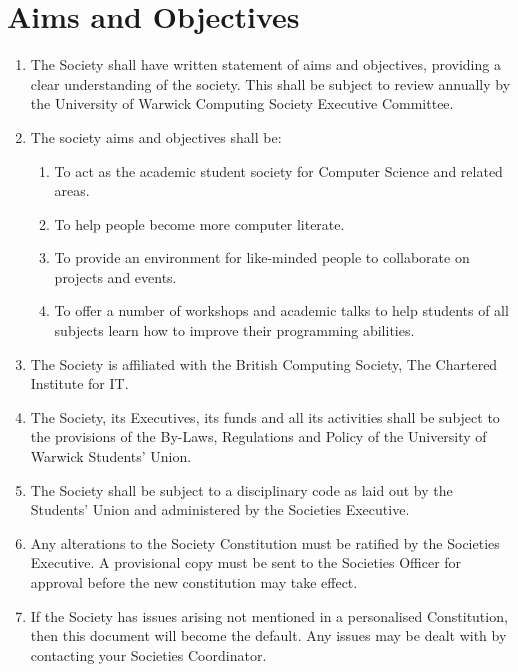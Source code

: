 \documentclass{article}
\begin{document}
\section{Aims and Objectives}
\begin{enumerate}
    \item The Society shall have written statement of aims and objectives, providing a clear understanding of the society. This shall be subject to review annually by the University of Warwick Computing Society Executive Committee.
    \item The society aims and objectives shall be:
    \begin{enumerate}
        \item To act as the academic student society for Computer Science and related areas.
        \item To help people become more computer literate.
        \item To provide an environment for like-minded people to collaborate on projects and events.
        \item To offer a number of workshops and academic talks to help students of all subjects learn how to improve their programming abilities.
    \end{enumerate}
    \item The Society is affiliated with the British Computing Society, The Chartered Institute for IT.
    \item The Society, its Executives, its funds and all its activities shall be subject to the provisions of the By-Laws, Regulations and Policy of the University of Warwick Students' Union.
    \item The Society shall be subject to a disciplinary code as laid out by the Students' Union and administered by the Societies Executive.
    \item Any alterations to the Society Constitution must be ratified by the Societies Executive. A provisional copy must be sent to the Societies Officer for approval before the new constitution may take effect.
    \item If the Society has issues arising not mentioned in a personalised Constitution, then this document will become the default. Any issues may be dealt with by contacting your Societies Coordinator.
\end{enumerate}
\end{document}
